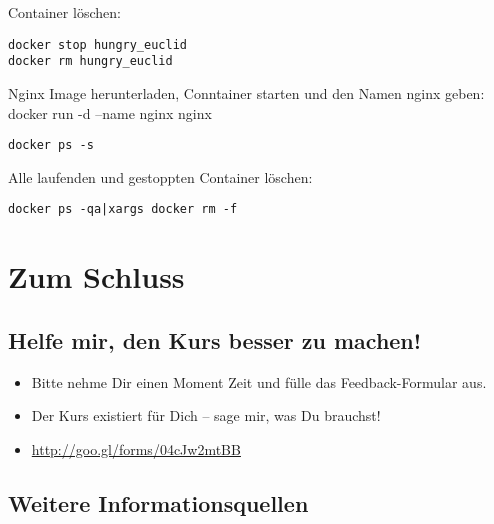 \documentclass[11pt]{article}
\begin{document}
Container löschen:

\label{dockerloeschen}
\begin{verbatim}
docker stop hungry_euclid
docker rm hungry_euclid
\end{verbatim}

Nginx Image herunterladen, Conntainer starten und den Namen nginx geben:
docker run -d --name nginx nginx

\label{dockerpss}
\begin{verbatim}
docker ps -s
\end{verbatim}

Alle laufenden und gestoppten Container löschen:

\label{dockerdelete}
\begin{verbatim}
docker ps -qa|xargs docker rm -f
\end{verbatim}


\section*{Zum Schluss}
\label{sec-2}

\subsection*{Helfe mir, den Kurs besser zu machen!}
\label{sec-2-1}
\begin{itemize}
\item Bitte nehme Dir einen Moment Zeit und fülle das Feedback-Formular aus.
\item Der Kurs existiert für Dich -- sage mir, was Du brauchst!
\item \url{http://goo.gl/forms/04cJw2mtBB}
\end{itemize}
\subsection*{Weitere Informationsquellen}
\label{sec-2-2}
\end{document}
